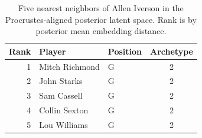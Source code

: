 \begin{table}[htbp]
  \centering\small
  \begin{tabular}{rllc}
    \toprule
    Rank & Player & Position & Archetype \\
    \midrule
    1 & Mitch Richmond & G & 2 \\
    2 & John Starks & G & 2 \\
    3 & Sam Cassell & G & 2 \\
    4 & Collin Sexton & G & 2 \\
    5 & Lou Williams & G & 2 \\
    \bottomrule
  \end{tabular}
  \caption{Five nearest neighbors of Allen Iverson in the Procrustes-aligned posterior latent space. Rank is by posterior mean embedding distance.}
  \label{tab:Allen_Iverson_neighbors}
\end{table}

